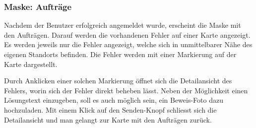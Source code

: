 \begin{figure}[H]
\hfill
{}
\end{figure}

\subsubsection{Maske: Aufträge}
Nachdem der Benutzer erfolgreich angemeldet wurde, erscheint die Maske mit den Aufträgen.
Darauf werden die vorhandenen Fehler auf einer Karte angezeigt.
Es werden jeweils nur die Fehler angezeigt, welche sich in unmittelbarer Nähe des eigenen Standorts befinden.
Die Fehler werden mit einer Markierung auf der Karte dargestellt.

Durch Anklicken einer solchen Markierung öffnet sich die Detailansicht des Fehlers, worin sich der Fehler direkt beheben lässt.
Neben der Möglichkeit einen Lösungstext einzugeben, soll es auch möglich sein, ein Beweis-Foto dazu hochzuladen.
Mit einem Klick auf den Senden-Knopf schliesst sich die Detailansicht und man gelangt zur Karte mit den Aufträgen zurück.

